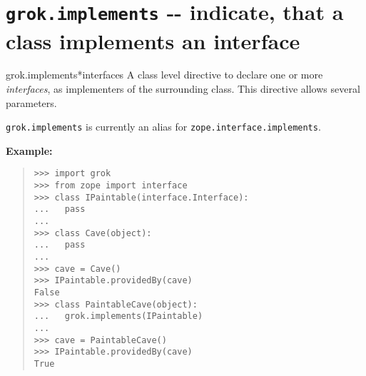 \documentclass[10pt,a4paper,english]{manual}
\newcommand{\titlereference}[1]{\textsl{#1}}
\begin{document}

\section{\texttt{grok.implements} -{}- indicate, that a class implements an interface}
\begin{funcdesc}{grok.implements}{*interfaces}
A class level directive to declare one or more \titlereference{interfaces}, as
implementers of the surrounding class. This directive allows
several parameters.

\texttt{grok.implements} is currently an alias for
\texttt{zope.interface.implements}.

\textbf{Example:}
\begin{quote}\begin{verbatim}
>>> import grok
>>> from zope import interface
>>> class IPaintable(interface.Interface):
...   pass
...
>>> class Cave(object):
...   pass
...
>>> cave = Cave()
>>> IPaintable.providedBy(cave)
False
>>> class PaintableCave(object):
...   grok.implements(IPaintable)
...
>>> cave = PaintableCave()
>>> IPaintable.providedBy(cave)
True
\end{verbatim}\end{quote}
\end{funcdesc}


\end{document}
